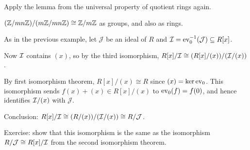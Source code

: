 \documentclass[12pt,letterpaper]{report}
\begin{document}
\begin{thmproof}
  Apply the lemma from the universal property of quotient rings again.
\end{thmproof}

\begin{ex}
  $(\mathbb{Z}/mn\mathbb{Z})/(m\mathbb{Z}/mn\mathbb{Z}) \cong \mathbb{Z}/{m}\mathbb{Z}$ as groups, and also as rings.
\end{ex}

\begin{ex}
  As in the previous example, let $\mathcal{J}$ be an ideal of $R$ and
  $\mathcal{I} = \operatorname{ev}_0^{-1}(\mathcal{J}) \subseteq R[x]$.

  Now $\mathcal{I}$ contains $(x)$, so by the third isomorphism,
  $R[x]/\mathcal{I} \cong (R[x]/(x))/(\mathcal{I}/(x))$.

  By first isomorphism theorem, $R[x]/(x) \cong R$ since $(x) = \ker\operatorname{ev}_0$.
  This isomorphism sends $f(x) + (x) \in R[x]/(x)$ to $\operatorname{ev}_0(f) = f(0)$, and hence identifies
  $\mathcal{I}/(x)$ with $\mathcal{J}$.

  Conclusion: $R[x]/\mathcal{I} \cong (R/(x))/(\mathcal{I}/(x)) \cong R/\mathcal{J}$.

  Exercise: show that this isomorphism is the same as the isomorphism
  $R/\mathcal{J} \cong R[x]/\mathcal{I}$ from the second isomorphism theorem.
\end{ex}

\end{document}
